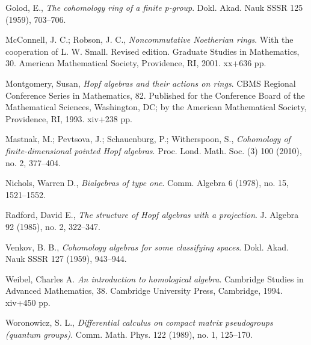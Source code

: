 \documentclass[a4paper,oneside,fleqn,11pt]{report}
\theoremstyle{definition}
\theoremstyle{definition}
\theoremstyle{definition}
\begin{document}
\begin{thebibliography}{999999}

 Golod, E.,
\textit{The cohomology ring of a finite p-group}.
Dokl. Akad. Nauk SSSR 125 (1959), 703–706. 


 McConnell, J. C.; Robson, J. C., \textit{Noncommutative Noetherian rings}. With the cooperation of L. W. Small. Revised edition. Graduate Studies in Mathematics, 30. American Mathematical Society, Providence, RI, 2001. xx+636 pp.


  Montgomery, Susan, \textit{Hopf algebras and their actions on rings}. CBMS Regional Conference Series in Mathematics, 82. Published for the Conference Board of the Mathematical Sciences, Washington, DC; by the American Mathematical Society, Providence, RI, 1993. xiv+238 pp.


 Mastnak, M.; Pevtsova, J.; Schauenburg, P.; Witherspoon, S.,
\textit{Cohomology of finite-dimensional pointed Hopf algebras}. 
Proc. Lond. Math. Soc. (3) 100 (2010), no. 2, 377–404.


 Nichols, Warren D., \textit{Bialgebras of type one}. Comm. Algebra 6 (1978), no. 15, 1521–1552.

 Radford, David E., \textit{The structure of Hopf algebras with a projection}. J. Algebra 92 (1985), no. 2, 322–347.

 Venkov, B. B.,
\textit{Cohomology algebras for some classifying spaces}.
Dokl. Akad. Nauk SSSR 127 (1959), 943–944.

 Weibel, Charles A.
\textit{An introduction to homological algebra}. 
Cambridge Studies in Advanced Mathematics, 38. Cambridge University Press, Cambridge, 1994. xiv+450 pp.

 Woronowicz, S. L.,
\textit{Differential calculus on compact matrix pseudogroups (quantum groups)}. 
Comm. Math. Phys. 122 (1989), no. 1, 125–170. 


\end{thebibliography}
\end{document}
